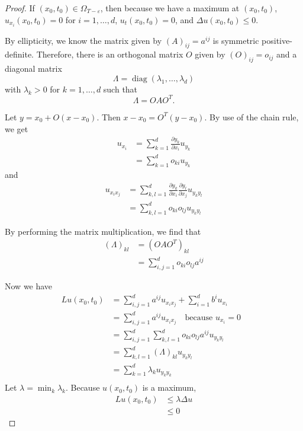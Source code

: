 \documentclass[a4paper]{article}
\begin{document}
\begin{enumerate}
\begin{proof}
      If $(x_0, t_0) \in \Omega_{T-\varepsilon}$, then because we have a maximum at $(x_0, t_0)$, $u_{x_i}(x_0,t_0) = 0$ for $i = 1, \dots, d$, $u_t(x_0,t_0) = 0$, and $\Delta u(x_0,t_0) \leq 0$.

      By ellipticity, we know the matrix given by $(A)_{ij} = a^{ij}$ is symmetric positive-definite. Therefore, there is an orthogonal matrix $O$
      given by $(O)_{ij} = o_{ij}$ and
      a diagonal matrix
      \[ \Lambda = \mathop{diag} (\lambda_1, \dots, \lambda_d) \]
      with $\lambda_k > 0$ for $k = 1, \dots, d$ such that
      \[ \Lambda = O A O^T .\]

      Let $y = x_0 + O(x - x_0)$. Then $x-x_0 = O^T(y-x_0)$. By use of the chain rule, we get
      \begin{align*}
        u_{x_i} &= \sum_{k=1}^d \frac{\partial y_k}{\partial x_i} u_{y_k} \\
        &= \sum_{k=1}^d o_{ki} u_{y_k}
     \end{align*}
     and
     \begin{align*}
       u_{x_i x_j} &= \sum_{k,l=1}^d \frac{\partial y_k}{\partial x_i} \frac{\partial y_l}{\partial x_j} u_{y_k y_l} \\
       &= \sum_{k,l=1}^d o_{ki} o_{lj} u_{y_k y_l}
     \end{align*}

     By performing the matrix multiplication, we find that
     \begin{align*}
       (\Lambda)_{kl} &= (OAO^T)_{kl} \\
       &= \sum_{i,j=1}^d o_{ki} o_{lj} a^{ij}
     \end{align*}

     Now we have
     \begin{align*}
       Lu(x_0,t_0) &= \sum_{i,j=1}^d a^{ij} u_{x_i x_j} + \sum_{i=1}^d b^i u_{x_i} \\
       &= \sum_{i,j=1}^d a^{ij} u_{x_i x_j} \quad \text{because $u_{x_i}=0$ } \\
       &= \sum_{i,j=1}^d \sum_{k,l=1}^d o_{ki} o_{lj} a^{ij} u_{y_k y_l} \\
       &= \sum_{k,l=1}^d (\Lambda)_{kl} u_{y_k y_l} \\
       &= \sum_{k=1}^d \lambda_k u_{y_k y_k} \\
     \end{align*}
    Let $\lambda = \min_{k} \lambda_k$.
    Because $u(x_0,t_0)$ is a maximum,
    \begin{align*}
      Lu(x_0,t_0) &\leq \lambda \Delta u \\
      &\leq 0
    \end{align*}


\end{proof}
\end{enumerate}
\end{document}
